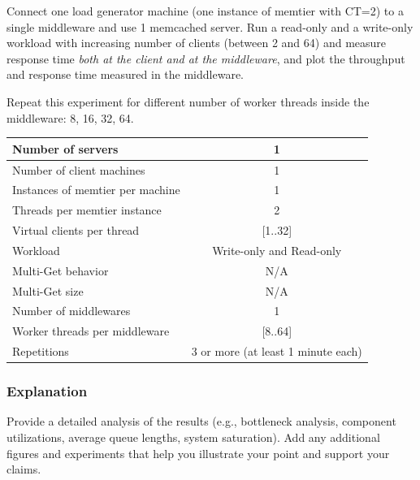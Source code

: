 \documentclass[11pt,a4paper]{article}
\begin{document}
Connect one load generator machine (one instance of memtier with CT=2) to a single middleware and use 1 memcached server. Run a read-only and a write-only workload with increasing number of clients (between 2 and 64) and measure response time \emph{both at the client and at the middleware}, and plot the throughput and response time measured in the middleware.

Repeat this experiment for different number of worker threads inside the middleware: 8, 16, 32, 64.

\begin{center}
	\scriptsize{
		\begin{tabular}{|l|c|}
			\hline Number of servers                & 1                        \\
			\hline Number of client machines        & 1                        \\
			\hline Instances of memtier per machine & 1                        \\
			\hline Threads per memtier instance     & 2                        \\
			\hline Virtual clients per thread       & [1..32]                  \\
			\hline Workload                         & Write-only and Read-only \\
			\hline Multi-Get behavior               & N/A                      \\
			\hline Multi-Get size                   & N/A                      \\
			\hline Number of middlewares            & 1                        \\
			\hline Worker threads per middleware    & [8..64]                  \\
			\hline Repetitions                      & 3 or more (at least 1 minute each)                \\
			\hline
		\end{tabular}
	}
\end{center}

\subsubsection{Explanation}

Provide a detailed analysis of the results (e.g., bottleneck analysis, component utilizations, average queue lengths, system saturation). Add any additional figures and experiments that help you illustrate your point and support your claims.
\end{document}
